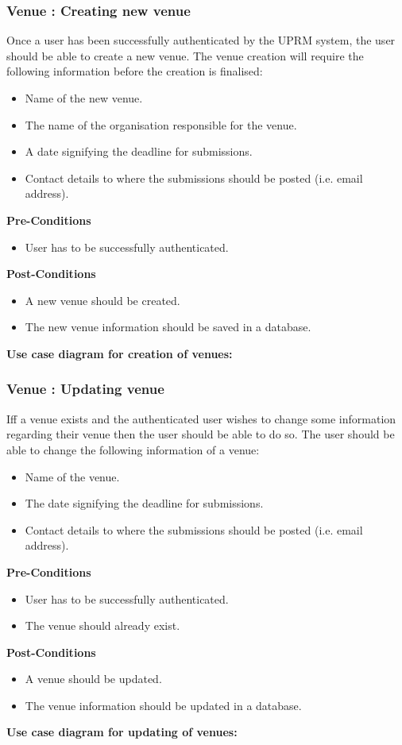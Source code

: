 \subsubsection{Venue : Creating new venue}
	Once a user has been successfully authenticated by the UPRM system, the user should be able to create a new venue. The venue creation will require the following information before the creation is finalised: 
	\begin{itemize}
		\item Name of the new venue.
		\item The name of the organisation responsible for the venue.
		\item A date signifying the deadline for submissions.
		\item Contact details to where the submissions should be posted (i.e. email address).
	\end{itemize}
	\textbf{Pre-Conditions}
	\begin{itemize}
		\item User has to be successfully authenticated.
	\end{itemize}
	\textbf{Post-Conditions}
	\begin{itemize}
		\item A new venue should be created.
		\item The new venue information should be saved in a database.
	\end{itemize}
	\textbf{Use case diagram for creation of venues: }\\
	\centerline{}
	
\subsubsection{Venue : Updating venue}
Iff a venue exists and the authenticated user wishes to change some information regarding their venue then the user should be able to do so. The user should be able to change the following information of a venue: 
\begin{itemize}
	\item Name of the venue.
	\item The date signifying the deadline for submissions.
	\item Contact details to where the submissions should be posted (i.e. email address).
\end{itemize}
\textbf{Pre-Conditions}
\begin{itemize}
	\item User has to be successfully authenticated.
	\item The venue should already exist.
\end{itemize}
\textbf{Post-Conditions}
\begin{itemize}
	\item A venue should be updated.
	\item The venue information should be updated in a database.
\end{itemize}
\textbf{Use case diagram for updating of venues: }\\
\centerline{}

